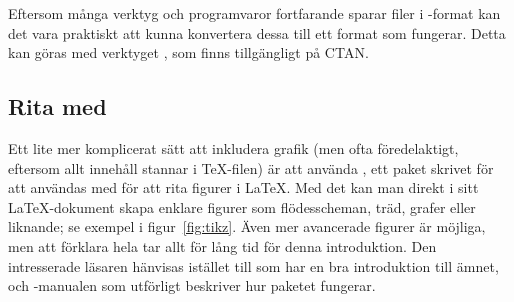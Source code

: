 \documentclass[../../latex.tex]{subfiles}
\begin{document}
Eftersom många verktyg och programvaror fortfarande sparar filer i
\EPS-format kan det vara praktiskt att kunna konvertera dessa till ett
format som fungerar. Detta kan göras med verktyget , som
finns tillgängligt på CTAN.

\subsection{Rita med \PGFTikZ}
Ett lite mer komplicerat sätt att inkludera grafik (men ofta 
föredelaktigt, eftersom allt innehåll stannar i \TeX-filen) är att använda
\PGFTikZ, ett paket skrivet för att användas med \pdfLaTeX{} för att rita
figurer i \LaTeX{}. Med det kan man direkt i sitt \LaTeX-dokument skapa
enklare figurer som flödesscheman, träd, grafer eller liknande; se exempel
i figur~\vref{fig:tikz}. Även mer avancerade figurer är möjliga, men att
förklara hela \PGFTikZ{} tar allt för lång tid för denna introduktion. Den
intresserade läsaren hänvisas istället till  som har
en bra introduktion till ämnet, och \PGFTikZ-manualen \cite{Tantau10} som
utförligt beskriver hur paketet fungerar.
\end{document}
